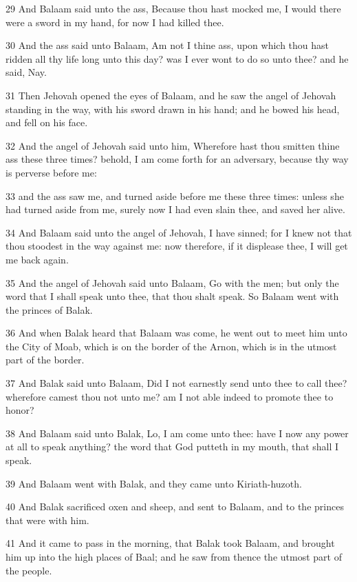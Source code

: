 \par 29 And Balaam said unto the ass, Because thou hast mocked me, I would there were a sword in my hand, for now I had killed thee.
\par 30 And the ass said unto Balaam, Am not I thine ass, upon which thou hast ridden all thy life long unto this day? was I ever wont to do so unto thee? and he said, Nay.
\par 31 Then Jehovah opened the eyes of Balaam, and he saw the angel of Jehovah standing in the way, with his sword drawn in his hand; and he bowed his head, and fell on his face.
\par 32 And the angel of Jehovah said unto him, Wherefore hast thou smitten thine ass these three times? behold, I am come forth for an adversary, because thy way is perverse before me:
\par 33 and the ass saw me, and turned aside before me these three times: unless she had turned aside from me, surely now I had even slain thee, and saved her alive.
\par 34 And Balaam said unto the angel of Jehovah, I have sinned; for I knew not that thou stoodest in the way against me: now therefore, if it displease thee, I will get me back again.
\par 35 And the angel of Jehovah said unto Balaam, Go with the men; but only the word that I shall speak unto thee, that thou shalt speak. So Balaam went with the princes of Balak.
\par 36 And when Balak heard that Balaam was come, he went out to meet him unto the City of Moab, which is on the border of the Arnon, which is in the utmost part of the border.
\par 37 And Balak said unto Balaam, Did I not earnestly send unto thee to call thee? wherefore camest thou not unto me? am I not able indeed to promote thee to honor?
\par 38 And Balaam said unto Balak, Lo, I am come unto thee: have I now any power at all to speak anything? the word that God putteth in my mouth, that shall I speak.
\par 39 And Balaam went with Balak, and they came unto Kiriath-huzoth.
\par 40 And Balak sacrificed oxen and sheep, and sent to Balaam, and to the princes that were with him.
\par 41 And it came to pass in the morning, that Balak took Balaam, and brought him up into the high places of Baal; and he saw from thence the utmost part of the people.

